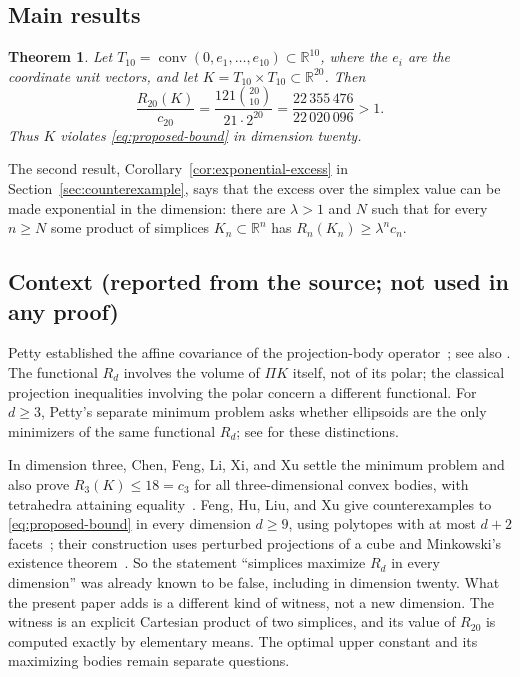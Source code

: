\documentclass[11pt]{article}
\newtheorem{theorem}{Theorem}
\newcommand{\R}{\mathbb R}
\DeclareMathOperator{\conv}{conv}
\begin{document}
\subsection{Main results}

\begin{theorem}\label{thm:counterexample}
Let \(T_{10}=\conv(0,e_1,\ldots,e_{10})\subset\R^{10}\), where the
\(e_i\) are the coordinate unit vectors, and let
\(K=T_{10}\times T_{10}\subset\R^{20}\). Then
\[
 \frac{R_{20}(K)}{c_{20}}
 =\frac{121\binom{20}{10}}{21\cdot2^{20}}
 =\frac{22\,355\,476}{22\,020\,096}>1.
\]
Thus \(K\) violates \eqref{eq:proposed-bound} in dimension twenty.
\end{theorem}

The second result, Corollary~\ref{cor:exponential-excess} in
Section~\ref{sec:counterexample}, says that the excess over the simplex
value can be made exponential in the dimension: there are \(\lambda>1\) and
\(N\) such that for every \(n\ge N\) some product of simplices
\(K_n\subset\R^n\) has \(R_n(K_n)\ge\lambda^n c_n\).

\subsection{Context (reported from the source; not used in any proof)}

Petty established the affine covariance of the projection-body
operator~\cite{Petty}; see also \cite[Equation~(1)]{Ludwig}. The functional
\(R_d\) involves the volume of \(\Pi K\) itself, not of its polar; the
classical projection inequalities involving the polar concern a different
functional. For \(d\ge3\), Petty's separate minimum problem asks whether
ellipsoids are the only minimizers of the same functional \(R_d\); see
\cite[Section~1]{Saroglou} for these distinctions.

In dimension three, Chen, Feng, Li, Xi, and Xu settle the minimum problem
and also prove \(R_3(K)\le18=c_3\) for all three-dimensional convex bodies,
with tetrahedra attaining equality~\cite[Theorems~1.1 and~1.2]{ChenEtAl}.
Feng, Hu, Liu, and Xu give counterexamples to \eqref{eq:proposed-bound} in
every dimension \(d\ge9\), using polytopes with at most \(d+2\)
facets~\cite[Theorem~1.3]{FengEtAl}; their construction uses perturbed
projections of a cube and Minkowski's existence
theorem~\cite[Section~4]{FengEtAl}. So the statement ``simplices maximize
\(R_d\) in every dimension'' was already known to be false, including in
dimension twenty. What the present paper adds is a different kind of
witness, not a new dimension. The witness is an explicit Cartesian product
of two simplices, and its value of \(R_{20}\) is computed exactly by
elementary means. The optimal upper constant and its maximizing bodies
remain separate questions.
\end{document}
